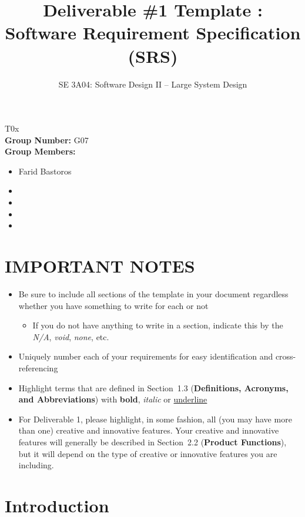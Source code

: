 \documentclass[]{article}
\title{Deliverable \#1 Template : Software Requirement Specification (SRS)}
\author{SE 3A04: Software Design II -- Large System Design}
\date{}
\begin{document}
\setlength\parindent{0pt} 
\setlength{\parskip}{\baselineskip}

\maketitle	
{} T0x\\
{\bf Group Number:} G07 \\
{\bf Group Members:} 
\begin{itemize}
	\item Farid Bastoros 
	\item 
	\item 
	\item
	\item  
\end{itemize}

\section*{IMPORTANT NOTES}
\begin{itemize}
	\item Be sure to include all sections of the template in your document regardless whether you have something to write for each or not
	\begin{itemize}
		\item If you do not have anything to write in a section, indicate this by the \emph{N/A}, \emph{void}, \emph{none}, etc.
	\end{itemize}
	\item Uniquely number each of your requirements for easy identification and cross-referencing
	\item Highlight terms that are defined in Section~1.3 (\textbf{Definitions, Acronyms, and Abbreviations}) with \textbf{bold}, \emph{italic} or \underline{underline}
	\item For Deliverable 1, please highlight, in some fashion, all (you may have more than one) creative and innovative features. Your creative and innovative features will generally be described in Section~2.2 (\textbf{Product Functions}), but it will depend on the type of creative or innovative features you are including.
\end{itemize}

\newpage
\section{Introduction}
\label{sec:introduction}
\end{document}
